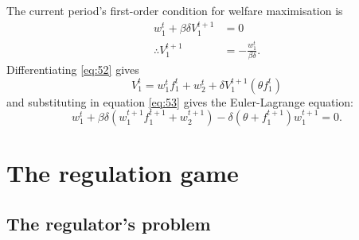 The current period's first-order condition for welfare maximisation is
\begin{align}
  w^t_1 + \beta\delta V^{t+1}_1 &= 0 \\
  \label{eq:53}
  \therefore V^{t+1}_1 &= -\frac{w^t_1}{\beta\delta}.
\end{align}
Differentiating \eqref{eq:52} gives
\begin{equation}
  \label{eq:54}
  V^t_1 = w^t_1f^t_1 + w^t_2 + \delta V^{t+1}_1 (\theta f^t_1)
\end{equation}
and substituting in equation \eqref{eq:53} gives the Euler-Lagrange
equation:
\begin{equation}
 \label{eq:85}
  w^t_1 + \beta\delta( w^{t+1}_1 f^{t+1}_1
  + w^{t+1}_2 ) - \delta (\theta + f^{t+1}_1)w^{t+1}_1 = 0.
\end{equation}

\section{The regulation game}
\label{sec:regulation-game-1}

\subsection{The regulator's problem}
\label{sec:regulators-problem-1}

